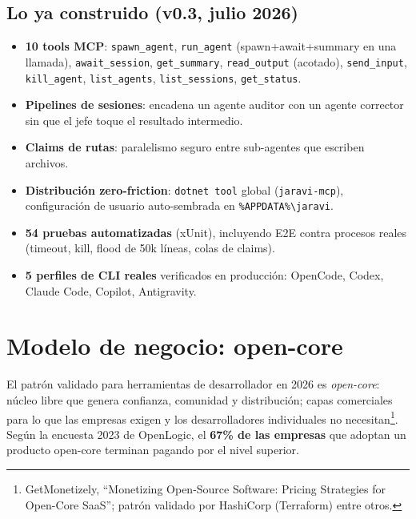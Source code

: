 \documentclass[11pt]{article}
\begin{document}
\subsection{Lo ya construido (v0.3, julio 2026)}
\begin{itemize}
\item \textbf{10 tools MCP}: \texttt{spawn\_agent}, \texttt{run\_agent} (spawn+await+summary en una llamada), \texttt{await\_session}, \texttt{get\_summary}, \texttt{read\_output} (acotado), \texttt{send\_input}, \texttt{kill\_agent}, \texttt{list\_agents}, \texttt{list\_sessions}, \texttt{get\_status}.
\item \textbf{Pipelines de sesiones}: encadena un agente auditor con un agente corrector sin que el jefe toque el resultado intermedio.
\item \textbf{Claims de rutas}: paralelismo seguro entre sub-agentes que escriben archivos.
\item \textbf{Distribución zero-friction}: \texttt{dotnet tool} global (\texttt{jaravi-mcp}), configuración de usuario auto-sembrada en \texttt{\%APPDATA\%\textbackslash jaravi}.
\item \textbf{54 pruebas automatizadas} (xUnit), incluyendo E2E contra procesos reales (timeout, kill, flood de 50k líneas, colas de claims).
\item \textbf{5 perfiles de CLI reales} verificados en producción: OpenCode, Codex, Claude Code, Copilot, Antigravity.
\end{itemize}

\section{Modelo de negocio: open-core}

El patrón validado para herramientas de desarrollador en 2026 es \emph{open-core}: núcleo libre que genera confianza, comunidad y distribución; capas comerciales para lo que las empresas exigen y los desarrolladores individuales no necesitan\footnote{GetMonetizely, ``Monetizing Open-Source Software: Pricing Strategies for Open-Core SaaS''; patrón validado por HashiCorp (Terraform) entre otros.}. Según la encuesta 2023 de OpenLogic, el \textbf{67\% de las empresas} que adoptan un producto open-core terminan pagando por el nivel superior.
\end{document}
